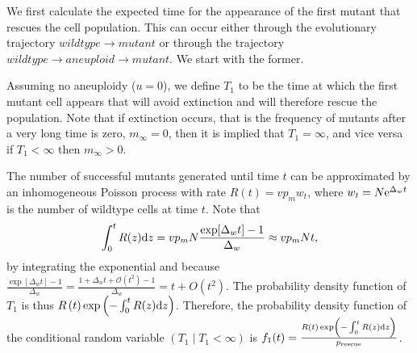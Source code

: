 \documentclass[12pt]{extarticle}
\renewcommand{\d}[1]{\ensuremath{\operatorname{d}\!{#1}}}
\renewcommand{\d}{{\rm d}}
\newcommand{\e}{{\rm e}}
\newcommand{\presc}{p_\text{rescue}}
\begin{document}
\begin{appendices}
We first calculate the expected time for the appearance of the first mutant that rescues the cell population.
This can occur either through the evolutionary trajectory $wildtype \rightarrow mutant$ or through the trajectory $wildtype \rightarrow aneuploid \rightarrow mutant$.
We start with the former. 

Assuming no aneuploidy ($u=0$), we define $T_1$ to be the time at which the first mutant cell appears that will avoid extinction and will therefore rescue the population.
Note that if extinction occurs, that is the frequency of mutants after a very long time is zero, $m_{\infty}=0$, then it is implied that $T_1=\infty$, and vice versa if $T_1<\infty$ then $m_{\infty}>0$.

The number of successful mutants generated until time $t$ can be approximated by an inhomogeneous Poisson process with rate $R\left(t\right) = v p_m w_t$,
where $w_t=N\e^{\Delta_w t}$ is the number of wildtype cells at time $t$.
Note that 
\begin{equation}\label{eq:integralR}
\int_0^{t}{R(z)\d z} = 
v p_m N \frac{\exp[{\Delta_w t}]-1}{\Delta_w} \approx 
v p_m N t,
\end{equation}
by integrating the exponential and because $\frac{\exp[\Delta_w t]-1}{\Delta_w}=\frac{1+\Delta_w t+\mathcal{O}(t^2)-1}{\Delta_w}=t+O(t^2)$.
The probability density function of $T_1$ is thus
$R\left(t\right)\exp\left(-\int_0^{t}{R(z)\d z}\right)$. %
Therefore, the probability density function of the conditional random variable $(T_1 \mid T_1 < \infty)$ is
$f_1(t) = \frac{R\left(t\right)\exp\left(-\int_0^{t}{R(z)\d z}\right)}{\presc}$. 
\\


\end{appendices}
\end{document}
